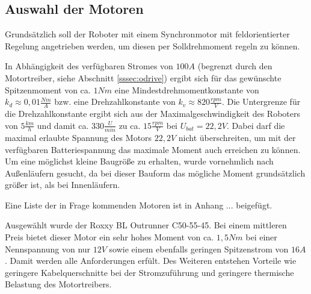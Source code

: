 \renewcommand{\autoren}{Stephan Morongowski}
\newpage
\subsection{Auswahl der Motoren}

Grundsätzlich soll der Roboter mit einem Synchronmotor mit feldorientierter Regelung angetrieben werden, um diesen per Solldrehmoment regeln zu können.

In Abhängigkeit des verfügbaren Stromes von \(100 A\) (begrenzt durch den Motortreiber, siehe Abschnitt \ref{sssec:odrive}) ergibt sich für das gewünschte Spitzenmoment von ca. \(1 Nm\) eine Mindestdrehmomentkonstante von \(k_d \approx 0,01 \frac{Nm}{A}\) bzw. eine Drehzahlkonstante von \(k_v \approx  820 \frac{rpm}{V}\). Die Untergrenze für die Drehzahlkonstante ergibt sich aus der Maximalgeschwindigkeit des Roboters von \(5 \frac{km}{h}\) und damit ca. \(330 \frac{U}{min}\) zu ca. \(15 \frac{rpm}{V}\) bei \(U_{bat} = 22,2 V\). Dabei darf die maximal erlaubte Spannung des Motors \(22,2 V\) nicht überschreiten, um mit der verfügbaren Batteriespannung das maximale Moment auch erreichen zu können. Um eine möglichst kleine Baugröße zu erhalten, wurde vornehmlich nach Außenläufern gesucht, da bei dieser Bauform das mögliche Moment grundsätzlich größer ist, als bei Innenläufern.

Eine Liste der in Frage kommenden Motoren ist in Anhang ... beigefügt.

Ausgewählt wurde der \glqq Roxxy BL Outrunner C50-55-45\grqq{}. Bei einem mittleren Preis bietet dieser Motor ein sehr hohes Moment von ca. \(1,5 Nm\) bei einer Nennspannung von nur \(12 V\) sowie einem ebenfalls geringen Spitzenstrom von \(16 A\). Damit werden alle Anforderungen erfült. Des Weiteren entstehen Vorteile wie geringere Kabelquerschnitte bei der Stromzuführung und geringere thermische Belastung des Motortreibers.
\newpage
